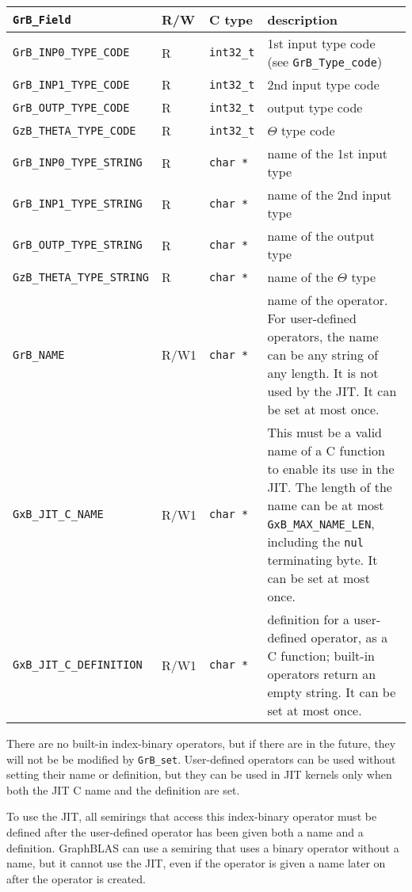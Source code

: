 \noindent
{\small
\begin{tabular}{|l|l|l|p{2.8in}|}
\hline
\verb'GrB_Field'                    & R/W  & C type        & description \\
\hline
\verb'GrB_INP0_TYPE_CODE'          & R    & \verb'int32_t'& 1st input type code (see \verb'GrB_Type_code') \\
\verb'GrB_INP1_TYPE_CODE'          & R    & \verb'int32_t'& 2nd input type code \\
\verb'GrB_OUTP_TYPE_CODE'          & R    & \verb'int32_t'& output type code \\
\verb'GzB_THETA_TYPE_CODE'         & R    & \verb'int32_t'& $\Theta$ type code \\
\verb'GrB_INP0_TYPE_STRING'        & R    & \verb'char *' & name of the 1st input type \\
\verb'GrB_INP1_TYPE_STRING'        & R    & \verb'char *' & name of the 2nd input type \\
\verb'GrB_OUTP_TYPE_STRING'        & R    & \verb'char *' & name of the output type \\
\verb'GzB_THETA_TYPE_STRING'       & R    & \verb'char *' & name of the $\Theta$ type \\
\hline
\verb'GrB_NAME'                     & R/W1 & \verb'char *' &    %
    name of the operator.
    For user-defined operators, the name can be any string of any length.  It
    is not used by the JIT.  It can be set at most once. \\
\verb'GxB_JIT_C_NAME'               & R/W1 & \verb'char *' &
    This must be a valid name of a C function to enable its use in the JIT.
    The length of the name can be at most \verb'GxB_MAX_NAME_LEN', including
    the \verb'nul' terminating byte.  It can be set at most once. \\
\verb'GxB_JIT_C_DEFINITION'         & R/W1 & \verb'char *' &
    definition for a user-defined operator, as a C function; built-in operators
    return an empty string.  It can be set at most once. \\
\hline
\end{tabular}
}

There are no built-in index-binary operators, but if there are in the future,
they will not be be modified by \verb'GrB_set'.  User-defined operators can be
used without setting their name or definition, but they can be used in JIT
kernels only when both the JIT C name and the definition are set.

To use the JIT, all semirings that access this index-binary operator must
be defined after the user-defined operator has been given both a name and a
definition.  GraphBLAS can use a semiring that uses a binary operator
without a name, but it cannot use the JIT, even if the operator is given a name
later on after the operator is created.

